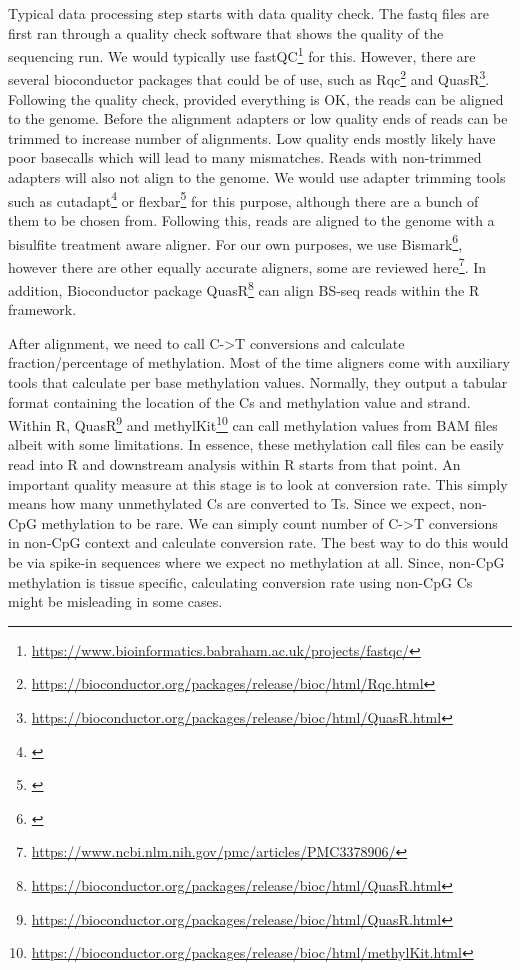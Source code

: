 \documentclass[12pt,]{krantz}
\renewcommand{\href}[2]{#2\footnote{\url{#1}}}
\begin{document}
Typical data processing step starts with data quality check. The fastq files are first ran through a quality check software that shows the quality of the sequencing run. We would typically use \href{https://www.bioinformatics.babraham.ac.uk/projects/fastqc/}{fastQC} for this. However, there are several bioconductor packages that could be of use, such as \href{https://bioconductor.org/packages/release/bioc/html/Rqc.html}{Rqc} and \href{https://bioconductor.org/packages/release/bioc/html/QuasR.html}{QuasR}. Following the quality check, provided everything is OK, the reads can be aligned to the genome. Before the alignment adapters or low quality ends of reads can be trimmed to increase number of alignments. Low quality ends mostly likely have poor basecalls which will lead to many mismatches. Reads with non-trimmed adapters will also not align to the genome. We would use adapter trimming tools such as \href{}{cutadapt} or \href{}{flexbar} for this purpose, although there are a bunch of them to be chosen from. Following this, reads are aligned to the genome with a bisulfite treatment aware aligner. For our own purposes, we use \href{}{Bismark}, however there are other equally accurate aligners, some are reviewed \href{https://www.ncbi.nlm.nih.gov/pmc/articles/PMC3378906/}{here}. In addition, Bioconductor package \href{https://bioconductor.org/packages/release/bioc/html/QuasR.html}{QuasR} can align BS-seq reads within the R framework.

After alignment, we need to call C-\textgreater{}T conversions and calculate fraction/percentage of methylation. Most of the time aligners come with auxiliary tools that calculate per base methylation values. Normally, they output a tabular format containing the location of the Cs and methylation value and strand. Within R, \href{https://bioconductor.org/packages/release/bioc/html/QuasR.html}{QuasR} and \href{https://bioconductor.org/packages/release/bioc/html/methylKit.html}{methylKit} can call methylation values from BAM files albeit with some limitations. In essence, these methylation call files can be easily read into R and downstream analysis within R starts from that point. An important quality measure at this stage is to look at conversion rate. This simply means how many unmethylated Cs are converted to Ts. Since we expect, non-CpG methylation to be rare. We can simply count number of C-\textgreater{}T conversions in non-CpG context and calculate conversion rate. The best way to do this would be via spike-in sequences where we expect no methylation at all. Since, non-CpG methylation is tissue specific, calculating conversion rate using non-CpG Cs might be misleading in some cases.
\end{document}
